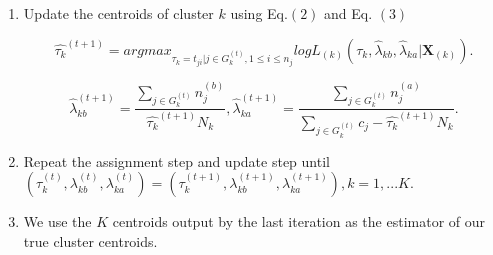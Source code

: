 \documentclass[12pt]{article}
\begin{document}
\begin{enumerate}[Step 1:]
\item Update the centroids of cluster $k$ using Eq.$(2)$ and Eq. $(3)$

\begin{equation}\label{eqn:tau_MLE}
\hat{\tau_k}^{(t+1)}= argmax_{\tau_k = t_{ji}|j \in G_k^{(t)}, 1\leq i \leq n_j}logL_{(k)}(\tau_k,\hat\lambda_{kb},\hat\lambda_{ka}|\pmb X_{(k)}).
\end{equation}

\begin{equation}\label{eqn:lam_MLE}
\hat{\lambda}_{kb}^{(t+1)}=\frac{\sum_{j \in G_k^{(t)}}n_j^{(b)}}{\hat{\tau_k}^{(t+1)}N_k},\hat{\lambda}_{ka}^{(t+1)}=\frac{\sum_{j \in G_k^{(t)}}n_j^{(a)}}{\sum_{j \in G_k^{(t)}}c_j- \hat{\tau_k}^{(t+1)}N_k}.
\end{equation}

\item Repeat the assignment step and update step until $(\tau_{k}^{(t)},\lambda_{kb}^{(t)},\lambda_{ka}^{(t)})=(\tau_{k}^{(t+1)},\lambda_{kb}^{(t+1)},\lambda_{ka}^{(t+1)}),k=1,...K$. 
\item We use the $K$ centroids output by the last iteration as the estimator of our true cluster centroids.
\end{enumerate}
\end{document}
